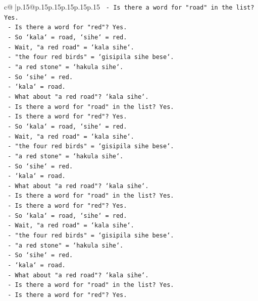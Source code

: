 \documentclass{article}
\begin{document}
{\begin{supertabular}{c@{$\;$}|p{.15\linewidth}@{}p{.15\linewidth}p{.15\linewidth}p{.15\linewidth}p{.15\linewidth}p{.15\linewidth}}
{{{\texttt{  {-} Is there a word for "road" in the list? Yes.} \\
\texttt{  {-} Is there a word for "red"? Yes.} \\
\texttt{  {-} So `kala` = road, `sihe` = red.} \\
\texttt{  {-} Wait, "a red road" = `kala sihe`.} \\
\texttt{  {-} "the four red birds" = `gisipila sihe bese`.} \\
\texttt{  {-} "a red stone" = `hakula sihe`.} \\
\texttt{  {-} So `sihe` = red.} \\
\texttt{  {-} `kala` = road.} \\
\texttt{  {-} What about "a red road"? `kala sihe`.} \\
\texttt{  {-} Is there a word for "road" in the list? Yes.} \\
\texttt{  {-} Is there a word for "red"? Yes.} \\
\texttt{  {-} So `kala` = road, `sihe` = red.} \\
\texttt{  {-} Wait, "a red road" = `kala sihe`.} \\
\texttt{  {-} "the four red birds" = `gisipila sihe bese`.} \\
\texttt{  {-} "a red stone" = `hakula sihe`.} \\
\texttt{  {-} So `sihe` = red.} \\
\texttt{  {-} `kala` = road.} \\
\texttt{  {-} What about "a red road"? `kala sihe`.} \\
\texttt{  {-} Is there a word for "road" in the list? Yes.} \\
\texttt{  {-} Is there a word for "red"? Yes.} \\
\texttt{  {-} So `kala` = road, `sihe` = red.} \\
\texttt{  {-} Wait, "a red road" = `kala sihe`.} \\
\texttt{  {-} "the four red birds" = `gisipila sihe bese`.} \\
\texttt{  {-} "a red stone" = `hakula sihe`.} \\
\texttt{  {-} So `sihe` = red.} \\
\texttt{  {-} `kala` = road.} \\
\texttt{  {-} What about "a red road"? `kala sihe`.} \\
\texttt{  {-} Is there a word for "road" in the list? Yes.} \\
\texttt{  {-} Is there a word for "red"? Yes.} \\
}}}
\end{supertabular}}
\end{document}
